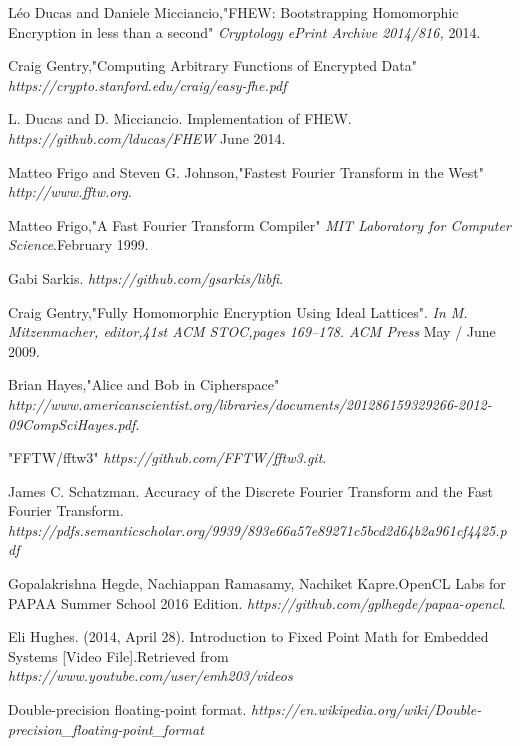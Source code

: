 \begin{thebibliography}{9}


 \label{fhew1}
Léo Ducas and Daniele Micciancio,"FHEW: Bootstrapping Homomorphic Encryption in less than a second"
\textit{Cryptology ePrint Archive 2014/816,} 2014.

 \label{easyfhe}
Craig Gentry,"Computing Arbitrary Functions of Encrypted Data"
\textit{https://crypto.stanford.edu/craig/easy-fhe.pdf} 

 \label{fhewlib}
L. Ducas and D. Micciancio. Implementation of FHEW.
\textit{https://github.com/lducas/FHEW} June 2014.

 \label{fftw}
Matteo Frigo and Steven G. Johnson,"Fastest Fourier Transform in the West"
\textit{http://www.fftw.org}.

 \label{fftw_paper}
Matteo Frigo,"A Fast Fourier Transform Compiler"
\textit{MIT Laboratory for Computer Science}.February 1999.

 \label{lib}
Gabi Sarkis. 
\textit{https://github.com/gsarkis/libfi}. 

 \label{lattices}
Craig Gentry,"Fully Homomorphic Encryption Using Ideal Lattices".
\textit{ In M. Mitzenmacher, editor,41st ACM STOC,pages 169–178. ACM Press} May / June 2009.

 \label{homo}
Brian Hayes,"Alice and Bob in Cipherspace"
\textit{http://www.americanscientist.org/libraries/documents/201286159329266-2012-09CompSciHayes.pdf}.

 \label{FFTW3git}
"FFTW/fftw3"
\textit{https://github.com/FFTW/fftw3.git}.


  \label{FFT accuracy}
James C. Schatzman. Accuracy of the Discrete Fourier Transform and the Fast Fourier Transform.
\textit{https://pdfs.semanticscholar.org/9939/893e66a57e89271c5bcd2d64b2a961cf4425.pdf}

 \label{papaa}
Gopalakrishna Hegde, Nachiappan Ramasamy, Nachiket Kapre.OpenCL Labs for PAPAA Summer School 2016 Edition.
\textit{https://github.com/gplhegde/papaa-opencl}. 

Eli Hughes. (2014, April 28). Introduction to Fixed Point Math for Embedded Systems [Video File].Retrieved from
\textit{https://www.youtube.com/user/emh203/videos}

 \label{dp}
Double-precision floating-point format.
\textit{https://en.wikipedia.org/wiki/Double-precision\_floating-point\_format}


\end{thebibliography}
